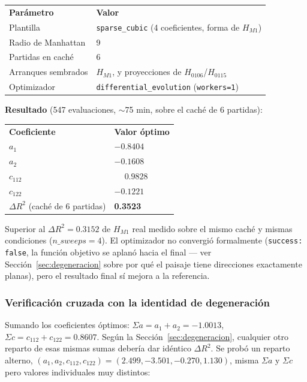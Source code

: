 \documentclass[11pt, a4paper]{article}
\newcommand{\TH}[1]{\cellcolor{cTHbg}\color{white}\textbf{#1}}
\newcommand{\good}[1]{\color{cGood}\textbf{#1}}
\begin{document}
\begin{center}
\begin{tabular}{ll}
  \TH{Par\'ametro} & \TH{Valor} \\[1pt]
  Plantilla & \texttt{sparse\_cubic} (4 coeficientes, forma de $H_{M1}$) \\
  Radio de Manhattan & 9 \\
  Partidas en cach\'e & 6 \\
  Arranques sembrados & $H_{M1}$, y proyecciones de $H_{0106}$/$H_{0115}$ \\
  Optimizador & \texttt{differential\_evolution} (\texttt{workers=1}) \\
\end{tabular}
\end{center}

\textbf{Resultado} (547 evaluaciones, $\sim$75 min, sobre el cach\'e
de 6 partidas):

\medskip
\begin{center}
\begin{tabular}{ll}
  \TH{Coeficiente} & \TH{Valor \'optimo} \\[1pt]
  $a_1$    & $-0.8404$ \\
  $a_2$    & $-0.1608$ \\
  $c_{112}$ & $\phantom{-}0.9828$ \\
  $c_{122}$ & $-0.1221$ \\
  $\Delta R^2$ (cach\'e de 6 partidas) & \good{0.3523} \\
\end{tabular}
\end{center}
\medskip

Superior al $\Delta R^2=0.3152$ de $H_{M1}$ real medido sobre el mismo
cach\'e y mismas condiciones ($n\_sweeps=4$). El optimizador no
convergi\'o formalmente (\texttt{success: false}, la funci\'on
objetivo se aplan\'o hacia el final --- ver Secci\'on~\ref{sec:degeneracion}
sobre por qu\'e el paisaje tiene direcciones exactamente planas), pero
el resultado final s\'i mejora a la referencia.

\subsubsection{Verificaci\'on cruzada con la identidad de degeneraci\'on}

Sumando los coeficientes \'optimos: $\Sigma a = a_1+a_2 = -1.0013$,
$\Sigma c = c_{112}+c_{122} = 0.8607$. Seg\'un la
Secci\'on~\ref{sec:degeneracion}, cualquier otro reparto de esas
mismas sumas deber\'ia dar id\'entico $\Delta R^2$. Se prob\'o un
reparto alterno, $(a_1,a_2,c_{112},c_{122}) = (2.499,-3.501,-0.270,1.130)$,
misma $\Sigma a$ y $\Sigma c$ pero valores individuales muy distintos:
\end{document}
